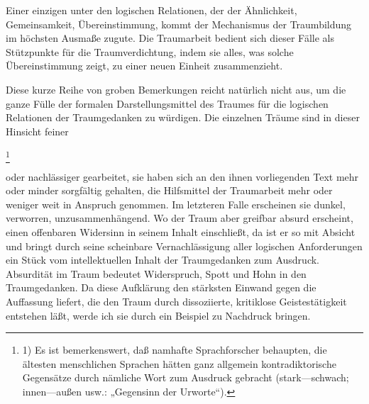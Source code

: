 \documentclass[twoside=true,titlepage=false,open=any, parskip=never, fontsize=10pt, headings=small, chapterprefix=false, appendixprefix=false]{scrbook}
\begin{document}
            
        \pstart
        Einer einzigen unter den logischen Relationen, der der Ähnlichkeit, Gemeinsamkeit,
                  Übereinstimmung, kommt der Mechanismus der Traumbildung im höchsten
               Ausmaße zugute. Die Traumarbeit bedient sich dieser Fälle als Stützpunkte für
               die Traumverdichtung, indem sie alles, was solche Übereinstimmung zeigt, zu
               einer neuen Einheit zusammenzieht.
        \pend
    
            
        \pstart
        Diese kurze Reihe von groben Bemerkungen reicht natürlich nicht aus, um die
               ganze Fülle der formalen Darstellungsmittel des Traumes für die logischen
               Relationen der Traumgedanken zu würdigen. Die einzelnen Träume sind in dieser
               Hinsicht feiner
        \pend
    
            
        \footnote{1) Es ist bemerkenswert, daß
               namhafte Sprachforscher behaupten, die ältesten menschlichen Sprachen hätten
               ganz allgemein kontradiktorische Gegensätze durch 
     nämliche Wort zum Ausdruck
               gebracht (stark—schwach; innen—außen usw.: „Gegensinn der Urworte“).}
    
         
            
            
            
        \pstart
        oder nachlässiger gearbeitet, sie haben sich an den ihnen vorliegenden Text mehr oder minder sorgfältig gehalten, die Hilfsmittel der Traumarbeit mehr oder weniger weit in Anspruch
               genommen. Im letzteren Falle erscheinen sie dunkel, verworren,
               unzusammenhängend. Wo der Traum aber greifbar absurd erscheint, einen offenbaren
               Widersinn in seinem Inhalt einschließt, da ist er so mit Absicht und bringt
               durch seine scheinbare Vernachlässigung aller logischen Anforderungen
               ein Stück vom intellektuellen Inhalt der Traumgedanken zum Ausdruck.
               Absurdität im Traum bedeutet Widerspruch, Spott und Hohn in
               den Traumgedanken. Da diese Aufklärung den stärksten Einwand gegen die
               Auffassung liefert, die den Traum durch dissoziierte, kritiklose
               Geistestätigkeit entstehen läßt, werde ich sie durch ein Beispiel zu Nachdruck
               bringen.
        \pend
    
\end{document}
